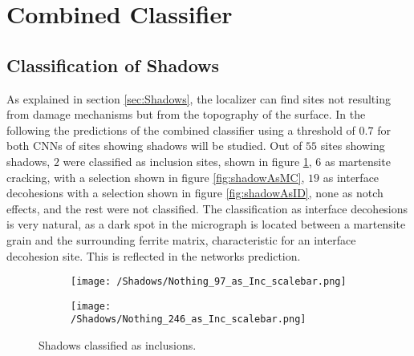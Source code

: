 
\section{Combined Classifier}
%

\subsection{Classification of Shadows}
\label{sec:Robustness}
As explained in section \ref{sec:Shadows}, the localizer can find sites not resulting from damage mechanisms but from the topography of the surface. In the following the predictions of the combined classifier using a threshold of $0.7$ for both CNNs of sites showing shadows will be studied. Out of $55$ sites showing shadows, $2$ were classified as inclusion sites, shown in figure \ref{fig:shadowAsInc}, $6$ as martensite cracking, with a selection shown in figure \ref{fig:shadowAsMC}, $19$ as interface decohesions with a selection shown in figure \ref{fig:shadowAsID}, none as notch effects, and the rest were not classified. The classification as interface decohesions is very natural, as a dark spot in the micrograph is located between a martensite grain and the surrounding ferrite matrix, characteristic for an interface decohesion site. This is reflected in the networks prediction.

\begin{figure}[H]
\centering
\begin{subfigure}{0.24\textwidth}
\texttt{[image: /Shadows/Nothing\_97\_as\_Inc\_scalebar.png]}
\caption{}
\end{subfigure}
\centering
\begin{subfigure}{0.24\textwidth}
\texttt{[image: /Shadows/Nothing\_246\_as\_Inc\_scalebar.png]}
\caption{}
\end{subfigure}
\caption{Shadows classified as inclusions.}
\label{fig:shadowAsInc}
\end{figure}

